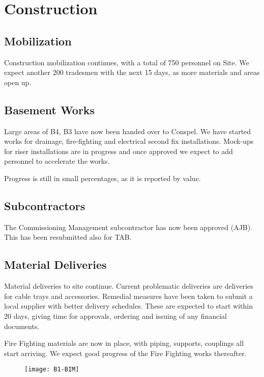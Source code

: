 \chapter{Construction}

\section{Mobilization} 

Construction mobilization continues, with a total of 750 personnel on Site. We expect another 200 tradesmen with the next 15 days, as more materials and areas open up.

\section{Basement Works}

Large areas of B4, B3 have now been handed over to Conspel. We have started works for drainage, fire-fighting and electrical second fix installations. Mock-ups for riser installations are in progress and once approved we expect to add personnel to accelerate the works.

Progress is still in small percentages, as it is reported by value. 

\section{Subcontractors}

The Commissioning Management subcontractor has now been approved (AJB). This has been resubmitted also for TAB.

\section{Material Deliveries}

Material deliveries to site continue. Current problematic deliveries are deliveries for cable trays and accessories. Remedial measures have been
taken to submit a local supplier with better delivery schedules. These are expected to start within 20 days, giving time for approvals, ordering
and issuing of any financial documents.

Fire Fighting materials are now in place, with piping, supports, couplings all start arriving. We expect good progress of the Fire Fighting works
thereafter.

\begin{figure}[htbp]
\texttt{[image: B1-BIM]}
\end{figure}

